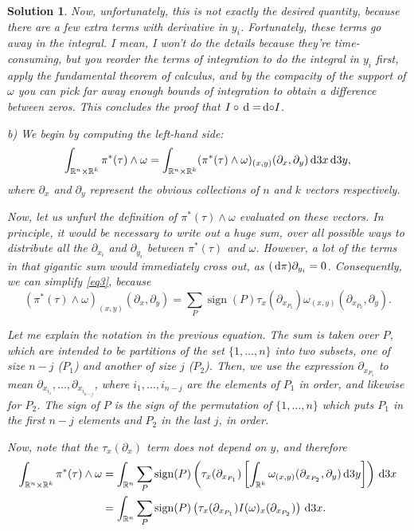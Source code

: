 \documentclass{article}
\theoremstyle{nonumberplain}
\newtheorem{sol}{Solution}
\newcommand{\R}{\mathbb{R}}
\DeclareMathOperator{\sign}{sign}
\begin{document}
\begin{sol}
Now, unfortunately, this is not exactly the desired quantity, because there are a few extra terms with derivative in $y_i$. Fortunately, these terms go away in the integral. I mean, I won't do the details because they're time-consuming, but you reorder the terms of integration to do the integral in $y_i$ first, apply the fundamental theorem of calculus, and by the compacity of the support of $\omega$ you can pick far away enough bounds of integration to obtain a difference between zeros. This concludes the proof that $I \circ \dl = \dl \circ I$.

\medskip

b) We begin by computing the left-hand side:
\begin{equation}\label{eq3}
\int_{\R^n \times \R^k} \pi^*(\tau) \wedge \omega = \int_{\R^n \times \R^k} (\pi^*(\tau) \wedge \omega)_{(x,y)}(\partial_x, \partial_y) \dl3 x \dl3 y,
\end{equation}
where $\partial_x$ and $\partial_y$ represent the obvious collections of $n$ and $k$ vectors respectively.

Now, let us unfurl the definition of $\pi^*(\tau) \wedge \omega$ evaluated on these vectors. In principle, it would be necessary to write out a huge sum, over all possible ways to distribute all the $\partial_{x_i}$ and $\partial_{y_i}$ between $\pi^*(\tau)$ and $\omega$. However, a lot of the terms in that gigantic sum would immediately cross out, as $(\dl \pi) \partial_{y_i} = 0$. Consequently, we can simplify \eqref{eq3}, because
\[(\pi^*(\tau) \wedge \omega)_{(x,y)}(\partial_x, \partial_y) = \sum_P \sign(P) \tau_x(\partial_{x_{P_1}}) \omega_{(x,y)}(\partial_{x_{P_2}},\partial_y).\]

Let me explain the notation in the previous equation. The sum is taken over $P$, which are intended to be partitions of the set $\{1,\dots,n\}$ into two subsets, one of size $n-j$ ($P_1$) and another of size $j$ ($P_2$). Then, we use the expression $\partial_{x_{P_1}}$ to mean $\partial_{x_{i_1}}, \dots, \partial_{x_{i_{n-j}}}$, where $i_1, \dots, i_{n-j}$ are the elements of $P_1$ in order, and likewise for $P_2$. The sign of $P$ is the sign of the permutation of $\{1,\dots,n\}$ which puts $P_1$ in the first $n-j$ elements and $P_2$ in the last $j$, in order.

Now, note that the $\tau_x(\partial_x)$ term does not depend on $y$, and therefore
\begin{align*}
\int_{\R^n \times \R^k} \pi^*(\tau) \wedge \omega &= \int_{\R^n} \sum_P \sign(P) \left( \tau_x(\partial_{x_{P_1}}) \left[ \int_{\R^k} \omega_{(x,y)}(\partial_{x_{P_2}},\partial_y) \dl3 y \right] \right) \dl3 x\\
&= \int_{\R^n} \sum_P \sign(P) \left( \tau_x(\partial_{x_{P_1}}) I(\omega)_x(\partial_{x_{P_2}}) \right) \dl3 x.
\end{align*}


\end{sol}
\end{document}
